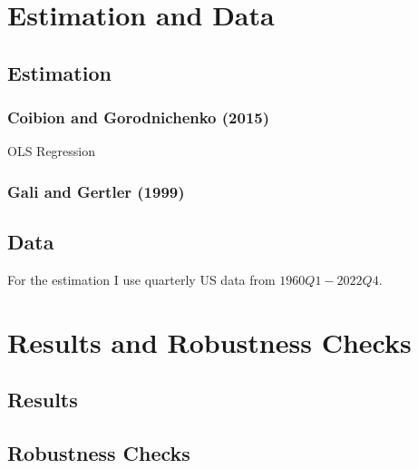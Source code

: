 \documentclass[11pt, a4paper, leqno]{article}
\begin{document}
\section{Estimation and Data} \label{estimation}
\subsection{Estimation}
\subsubsection{Coibion and Gorodnichenko (2015)}
OLS Regression

\subsubsection{Gali and Gertler (1999)}

\subsection{Data}
For the estimation I use quarterly US data from $1960Q1-2022Q4$.

\section{Results and Robustness Checks} \label{results}
\subsection{Results}
%    





\subsection{Robustness Checks}
\end{document}
